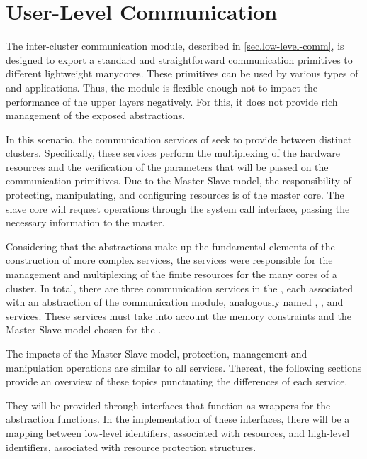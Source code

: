 	\section{User-Level Communication}
	\label{sec.comm-services}

		The inter-cluster communication module, described in \autoref{sec.low-level-comm},
		is designed to export a standard and straightforward communication
		primitives to different lightweight manycores.
		These primitives can be used by various types of \oss and applications.
		Thus, the module is flexible enough not to impact the performance
		of the upper layers negatively.
		For this, it does not provide rich management of the exposed abstractions.

		In this scenario, the communication services of \nanvix \microkernel seek
		to provide \ipc between distinct clusters.
		Specifically, these services perform the multiplexing of the hardware
		resources and the verification of the parameters that will be passed
		on the communication primitives.
		Due to the Master-Slave model, the responsibility of protecting,
		manipulating, and configuring \hal resources is of the master core.
		The slave core will request operations through the system call interface,
		passing the necessary information to the master.

		Considering that the abstractions make up the fundamental elements of
		the construction of more complex services, the \microkernel services
		were responsible for the management and multiplexing of the finite
		resources for the many cores of a cluster.
		In total, there are three communication services in the \nanvix \microkernel,
		each associated with an abstraction of the communication module,
		analogously named \sync, \mailbox, and \portal services.
		These services must take into account the memory constraints and the
		Master-Slave model chosen for the \microkernel.

		The impacts of the Master-Slave model, protection, management and manipulation 
		operations are similar to all services.
		Thereat, the following sections provide an overview of these topics punctuating 
		the differences of each service.

		They will be provided through interfaces that function as wrappers
		for the \hal abstraction functions.
		In the implementation of these interfaces, there will be a mapping
		between low-level identifiers, associated with \hal resources,
		and high-level identifiers, associated with resource protection structures.


